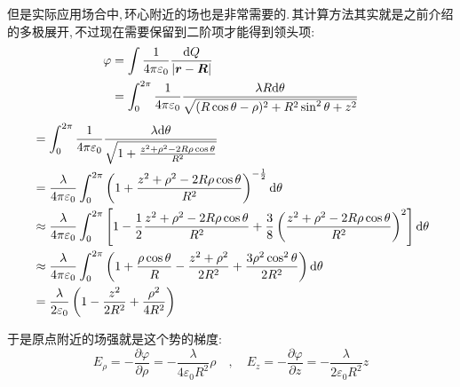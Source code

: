 但是实际应用场合中,\,环心附近的场也是非常需要的.\,其计算方法其实就是之前介绍的多极展开,\,不过现在需要保留到二阶项才能得到领头项:
\begin{align*}
\varphi  	&= \int \frac{1}{4\pi\varepsilon_0} \frac{\textrm{d} Q}{|\boldsymbol{r}-\boldsymbol{R}|}\\
				&= \int_0^{2\pi} \frac{1}{4\pi\varepsilon_0} \frac{\lambda R\textrm{d} \theta}{\sqrt{(R\cos\theta -\rho)^2+ R^2\sin^2 \theta +z^2}}\\
				\end{align*}
				\begin{align*}
				&= \int_0^{2\pi} \frac{1}{4\pi\varepsilon_0} \frac{\lambda \textrm{d} \theta}{\sqrt{1+\frac{z^2+\rho^2-2R\rho\cos\theta}{R^2}}}\\
				&= \frac{\lambda}{4\pi\varepsilon_0}\int_0^{2\pi} \left(1+\frac{z^2+\rho^2-2R\rho\cos\theta}{R^2}\right)^{-\frac{1}{2}}\textrm{d} \theta\\
				&\approx \frac{\lambda}{4\pi\varepsilon_0}\int_0^{2\pi} \left[1-\frac{1}{2}\frac{z^2+\rho^2-2R\rho\cos\theta}{R^2}+\frac{3}{8}\left( \frac{z^2+\rho^2-2R\rho\cos\theta}{R^2} \right)^2 \right]\textrm{d} \theta\\
				&\approx \frac{\lambda}{4\pi\varepsilon_0}\int_0^{2\pi} \left(1+\frac{\rho\cos\theta}{R}-\frac{z^2+\rho^2}{2R^2}+\frac{3\rho^2\cos^2\theta}{2R^2} \right)\textrm{d} \theta\\
				&= \frac{\lambda}{2\varepsilon_0}\left(1-\frac{z^2}{2R^2}+\frac{\rho^2}{4R^2} \right)\\
\end{align*}

于是原点附近的场强就是这个势的梯度:
\[E_\rho=-\frac{\partial \varphi}{\partial \rho}=-\frac{\lambda}{4\varepsilon_0 R^2}\rho \quad,\quad E_z=-\frac{\partial \varphi}{\partial z}=-\frac{\lambda}{2\varepsilon_0 R^2}z\]

